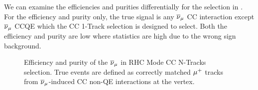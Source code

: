 We can examine the efficiencies and purities differentially for the
selection in . For the efficiency
and purity only, the true signal is any $\numubar$ CC interaction
except $\numubar$ CCQE which the CC 1-Track selection is designed
to select. Both the efficiency and purity are low where statistics
are high due to the wrong sign background.

\begin{figure}
\begin{centering}
\par\end{centering}
\caption[Efficiency and Purity of the $\numubar$ in RHC Mode CC N-Tracks Selection]{Efficiency and purity of the $\protect\overline{\nu}_{\mu}$ in RHC Mode CC N-Tracks
selection. True events are defined as correctly matched $\protect\mu^{+}$
tracks from $\protect\overline{\nu}_{\mu}$-induced CC non-QE interactions at
the vertex. \label{fig:numubarRHCCCNTrkRecoEffPur}}
\end{figure}

